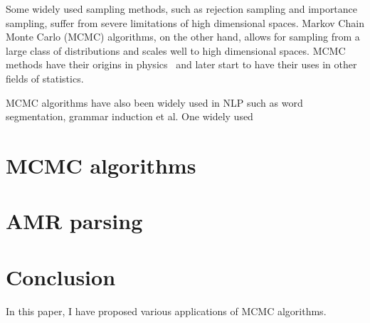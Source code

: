 \documentclass[12pt,leqno]{report}
\begin{document}
\begin{CJK}{UTF8}{cyberbit}
Some widely used sampling methods, such as rejection sampling and importance sampling, suffer from severe limitations of high dimensional spaces. Markov Chain Monte Carlo (MCMC)
algorithms, on the other hand, allows for sampling from a large class of distributions and scales well to high dimensional spaces. MCMC methods have their origins in physics~\cite{metropolis1949monte} and later start to have
their uses in other fields of statistics.


MCMC algorithms have also been widely used in NLP such as word segmentation, grammar induction et al. One widely used 
\break

\chapter{MCMC algorithms}
\label{chap:MCMC}

\break

\chapter{AMR parsing}
\label{chap:amr}

\break

%
%
%
%
%
\chapter{Conclusion}
\label{chap:conclusion}
In this paper, I have proposed various applications of MCMC algorithms.
\break



\appendix
\end{CJK}
\end{document}
